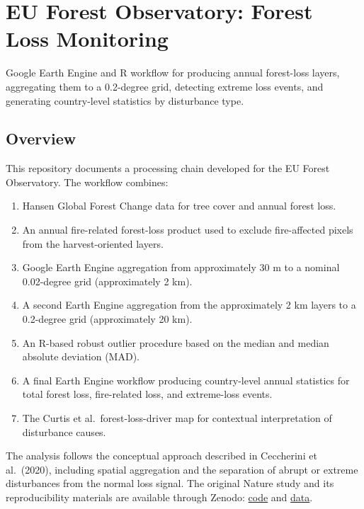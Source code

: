 \documentclass[
]{article}
\author{}
\date{\vspace{-2.5em}}
\providecommand{\tightlist}{%
  \setlength{\itemsep}{0pt}\setlength{\parskip}{0pt}}
\begin{document}
\section{EU Forest Observatory: Forest Loss
Monitoring}\label{eu-forest-observatory-forest-loss-monitoring}

Google Earth Engine and R workflow for producing annual forest-loss
layers, aggregating them to a 0.2-degree grid, detecting extreme loss
events, and generating country-level statistics by disturbance type.

\subsection{Overview}\label{overview}

This repository documents a processing chain developed for the EU Forest
Observatory. The workflow combines:

\begin{enumerate}
\def\labelenumi{\arabic{enumi}.}
\tightlist
\item
  Hansen Global Forest Change data for tree cover and annual forest
  loss.
\item
  An annual fire-related forest-loss product used to exclude
  fire-affected pixels from the harvest-oriented layers.
\item
  Google Earth Engine aggregation from approximately 30 m to a nominal
  0.02-degree grid (approximately 2 km).
\item
  A second Earth Engine aggregation from the approximately 2 km layers
  to a 0.2-degree grid (approximately 20 km).
\item
  An R-based robust outlier procedure based on the median and median
  absolute deviation (MAD).
\item
  A final Earth Engine workflow producing country-level annual
  statistics for total forest loss, fire-related loss, and extreme-loss
  events.
\item
  The Curtis et al.~forest-loss-driver map for contextual interpretation
  of disturbance causes.
\end{enumerate}

The analysis follows the conceptual approach described in Ceccherini et
al.~(2020), including spatial aggregation and the separation of abrupt
or extreme disturbances from the normal loss signal. The original Nature
study and its reproducibility materials are available through Zenodo:
\href{https://doi.org/10.5281/zenodo.3687096}{code} and
\href{https://doi.org/10.5281/zenodo.3687090}{data}.
\end{document}
